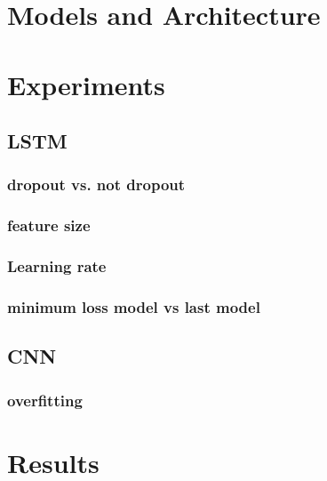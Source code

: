 \documentclass[a4paper]{article}
\begin{document}

\section{Models and Architecture}


\section{Experiments}
\subsection{LSTM}
\subsubsection{dropout vs. not dropout}
\subsubsection{feature size}
\subsubsection{Learning rate}
\subsubsection{minimum loss model vs last model}

\subsection{CNN}
\subsubsection{overfitting}

\section{Results}
\end{document}

